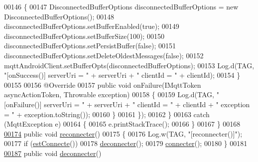 \begin{DoxyCode}
00146                 \{
00147                     DisconnectedBufferOptions disconnectedBufferOptions = \textcolor{keyword}{new} DisconnectedBufferOptions();
00148                     disconnectedBufferOptions.setBufferEnabled(\textcolor{keyword}{true});
00149                     disconnectedBufferOptions.setBufferSize(100);
00150                     disconnectedBufferOptions.setPersistBuffer(\textcolor{keyword}{false});
00151                     disconnectedBufferOptions.setDeleteOldestMessages(\textcolor{keyword}{false});
00152                     mqttAndroidClient.setBufferOpts(disconnectedBufferOptions);
00153                     Log.d(TAG, \textcolor{stringliteral}{"[onSuccess()] serverUri = "} + serverUri + \textcolor{stringliteral}{" clientId = "} + clientId);
00154                 \}
00155 
00156                 @Override
00157                 \textcolor{keyword}{public} \textcolor{keywordtype}{void} onFailure(IMqttToken asyncActionToken, Throwable exception)
00158                 \{
00159                     Log.d(TAG, \textcolor{stringliteral}{"[onFailure()] serverUri = "} + serverUri + \textcolor{stringliteral}{" clientId = "} + clientId + \textcolor{stringliteral}{"
       exception = "} + exception.toString());
00160                 \}
00161             \});
00162         \}
00163         \textcolor{keywordflow}{catch} (MqttException e)
00164         \{
00165             e.printStackTrace();
00166         \}
00167     \}
00168 
\hyperlink{classcom_1_1example_1_1bee__honeyt_1_1_communication_ae0851e23e515c71cfa06cf635c731c07}{00174}     \textcolor{keyword}{public} \textcolor{keywordtype}{void} \hyperlink{classcom_1_1example_1_1bee__honeyt_1_1_communication_ae0851e23e515c71cfa06cf635c731c07}{reconnecter}()
00175     \{
00176         Log.w(TAG, \textcolor{stringliteral}{"[reconnecter()]"});
00177         \textcolor{keywordflow}{if} (\hyperlink{classcom_1_1example_1_1bee__honeyt_1_1_communication_a155e0619c3d504750871a84e637bb808}{estConnecte}())
00178             \hyperlink{classcom_1_1example_1_1bee__honeyt_1_1_communication_a55454851f5e883b1539bd60fa7f4bfc6}{deconnecter}();
00179         \hyperlink{classcom_1_1example_1_1bee__honeyt_1_1_communication_aadc176b28bce357bf655d0feec024013}{connecter}();
00180     \}
00181 
\hyperlink{classcom_1_1example_1_1bee__honeyt_1_1_communication_a55454851f5e883b1539bd60fa7f4bfc6}{00187}     \textcolor{keyword}{public} \textcolor{keywordtype}{void} \hyperlink{classcom_1_1example_1_1bee__honeyt_1_1_communication_a55454851f5e883b1539bd60fa7f4bfc6}{deconnecter}()

\end{DoxyCode}
